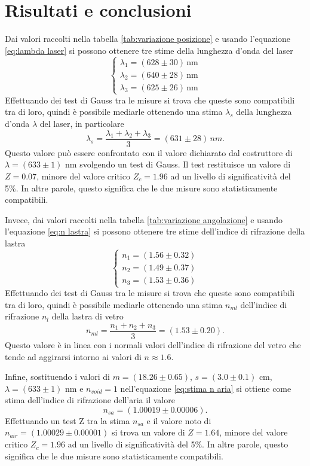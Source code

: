 \documentclass{article}
\begin{document}
\section{Risultati e conclusioni}
Dai valori raccolti nella tabella \ref{tab:variazione posizione} e usando l'equazione \eqref{eq:lambda laser} si possono ottenere tre stime della lunghezza d'onda del laser
\begin{equation}
    \begin{cases}
        \lambda_1=(628\pm30) \,\text{nm} \\
        \lambda_2=(640\pm28) \,\text{nm} \\
        \lambda_3=(625\pm26) \,\text{nm}
    \end{cases}
\end{equation}
Effettuando dei test di Gauss tra le misure si trova che queste sono compatibili tra di loro, quindi è possibile mediarle ottenendo una stima $\lambda_s$ della lunghezza d'onda $\lambda$ del laser, in particolare
\begin{equation}
    \lambda_s=\frac{\lambda_1+\lambda_2+\lambda_3}{3}=(631\pm28)\,\unit{nm}.
\end{equation}
Questo valore può essere confrontato con il valore dichiarato dal costruttore di $\lambda=(633\pm1)$ nm svolgendo un test di Gauss. Il test restituisce un valore di $Z=0.07$, minore del valore critico $Z_c=1.96$ ad un livello di significatività del 5\%. In altre parole, questo significa che le due misure sono statisticamente compatibili.

Invece, dai valori raccolti nella tabella \ref{tab:variazione angolazione} e usando l'equazione \eqref{eq:n lastra} si possono ottenere tre stime dell'indice di rifrazione della lastra
\begin{equation}
    \begin{cases}
        n_1=(1.56\pm0.32) \\
        n_2=(1.49\pm0.37) \\
        n_3=(1.53\pm0.36)
    \end{cases}
\end{equation}
Effettuando dei test di Gauss tra le misure si trova che queste sono compatibili tra di loro, quindi è possibile mediarle ottenendo una stima $n_{ml}$ dell'indice di rifrazione $n_l$ della lastra di vetro
\begin{equation}
    n_{ml}=\frac{n_1+n_2+n_3}{3}=(1.53\pm0.20).
\end{equation}
Questo valore è in linea con i normali valori dell'indice di rifrazione del vetro che tende ad aggirarsi intorno ai valori di $n\approx1.6$.

Infine, sostituendo i valori di $m=(18.26\pm0.65)$, $s=(3.0\pm0.1)$ cm, $\lambda=(633\pm1)$ nm e $n_{void}=1$ nell'equazione \eqref{eq:stima n aria} si ottiene come stima dell'indice di rifrazione dell'aria il valore
\begin{equation}
    \label{eq:stima n aria}
    n_{sa}=(1.00019\pm0.00006).
\end{equation}
Effettuando un test Z tra la stima $n_{sa}$ e il valore noto di $n_{air}=(1.00029\pm0.00001)$ si trova un valore di $Z=1.64$, minore del valore critico $Z_c=1.96$ ad un livello di significatività del 5\%. In altre parole, questo significa che le due misure sono statisticamente compatibili.
\end{document}
